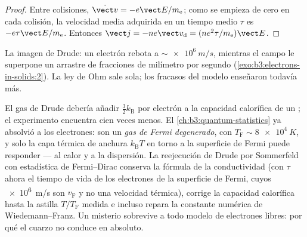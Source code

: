 \begin{proof}
Entre colisiones, $\dot{\vect v} = -e\vect E/m_{\text{e}}$;
como se empieza de cero en cada colisión, la velocidad media adquirida en un
tiempo medio $\tau$ es $-e\tau\vect E/m_{\text{e}}$. Entonces $\vect j =
-ne\vect v_{\text{d}} = (ne^2\tau/m_{\text{e}})\vect E$.
\end{proof}

\begin{omfigure}

{\small La imagen de Drude: un electrón rebota a
$\sim\qty{e6}{m/s}$, mientras el campo le superpone un arrastre de
fracciones de milímetro por segundo
(\cref{exo:b3:electrons-in-solids:2}). La ley de Ohm sale sola; los
fracasos del modelo enseñaron todavía más.}
\end{omfigure}

\begin{remark}\label{rem:b3:electrons-in-solids:sommerfeld}
El gas de Drude debería añadir $\tfrac32k_{\text{B}}$ por electrón a la
capacidad calorífica de un ; el experimento encuentra cien veces menos.
El \cref{ch:b3:quantum-statistics} ya absolvió a los electrones:
son un \emph{gas de Fermi degenerado}, con $T_{\text{F}} \sim
\qty{8e4}{K}$, y solo la capa térmica de anchura
$k_{\text{B}}T$ en torno a la superficie de Fermi puede responder --- al calor y
a la dispersión. La reejecución de Drude por Sommerfeld con estadística de
Fermi--Dirac conserva la fórmula de la conductividad (con $\tau$ ahora el
tiempo de vida de los electrones de la superficie de Fermi, cuyos \qty{e6}{m/s} son
$v_{\text{F}}$ y no una velocidad térmica), corrige la capacidad calorífica hasta la
astilla $T/T_{\text{F}}$ medida e incluso repara la constante numérica de
Wiedemann--Franz. Un misterio sobrevive a todo
modelo de electrones libres: por qué el cuarzo no conduce en absoluto.
\end{remark}


